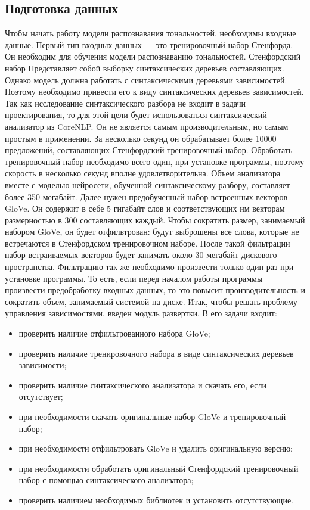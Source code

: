 \subsection{Подготовка данных}\label{subsec:sys:data_gathering}
Чтобы начать работу модели распознавания тональностей, необходимы входные данные. Первый тип входных данных --- это тренировочный набор Стенфорда. Он необходим для обучения модели распознаванию тональностей. Стенфордский набор Представляет собой выборку синтаксических деревьев составляющих. Однако модель должна работать с синтаксическими деревьями зависимостей. Поэтому необходимо привести его к виду синтаксических деревьев зависимостей. Так как исследование синтаксического разбора не входит в задачи проектирования, то для этой цели будет использоваться синтаксический анализатор из CoreNLP\@. Он не является самым производительным, но самым простым в применении. За несколько секунд он обрабатывает более 10000 предложений, составляющих Стенфордский тренировочный набор. Обработать тренировочный набор необходимо всего один, при установке программы, поэтому скорость в несколько секунд вполне удовлетворительна. Объем анализатора вместе с моделью нейросети, обученной синтаксическому разбору, составляет более 350 мегабайт. Далее нужен предобученный набор встроенных векторов GloVe\@. Он содержит в себе 5 гигабайт слов и соответствующих им векторам размерностью в 300 составляющих каждый. Чтобы сократить размер, занимаемый набором GloVe\@, он будет отфильтрован: будут выброшены все слова, которые не встречаются в Стенфордском тренировочном наборе. После такой фильтрации набор встраиваемых векторов будет занимать около 30 мегабайт дискового пространства. Фильтрацию так же необходимо произвести только один раз при установке программы. То есть, если перед началом работы программы произвести предобработку входных данных, то это повысит производительность и сократить объем, занимаемый системой на диске. Итак, чтобы решать проблему управления зависимостями, введен модуль развертки. В его задачи входит:

\begin{itemize}
\item проверить наличие отфильтрованного набора GloVe;
\item проверить наличие тренировочного набора в виде синтаксических деревьев зависимости;
\item проверить наличие синтаксического анализатора и скачать его, если отсутствует;
\item при необходимости скачать оригинальные набор GloVe и тренировочный набор;
\item при необходимости отфильтровать GloVe и удалить оригинальную версию;
\item при необходимости обработать оригинальный Стенфордский тренировочный набор с помощью синтаксического анализатора;
\item проверить наличием необходимых библиотек и установить отсутствующие.
\end{itemize}

